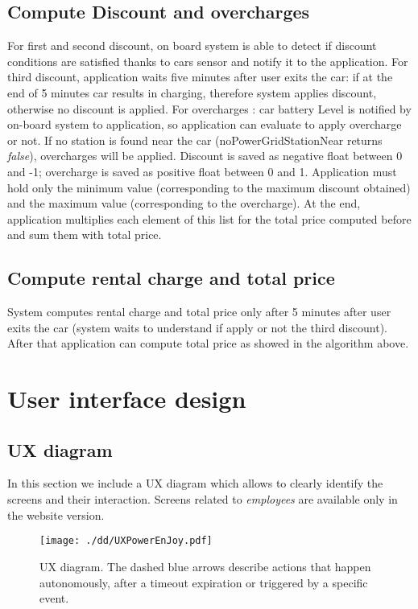 \documentclass{scrreprt}
\begin{document}
\section{Compute Discount and overcharges}
For first and second discount, on board system is able to detect if discount conditions are satisfied thanks to cars sensor and notify it to the application.
For third discount, application waits five minutes after user exits the car: if at the end of 5 minutes car results in charging, therefore system applies discount, otherwise no discount is applied.
For overcharges : car battery Level is notified by on-board system to application, so application can evaluate to apply overcharge or not. If no station is found near the car (noPowerGridStationNear returns \emph{false}), overcharges will be applied.
Discount is saved as negative float between 0 and -1; overcharge is saved as positive float between 0 and 1.
Application must hold only the minimum value (corresponding to the maximum discount obtained) and the maximum value (corresponding to the overcharge).
At the end, application multiplies each element of this list for the total price computed before and sum them with total price.

\section{Compute rental charge and total price}
System computes rental charge and total price only after 5 minutes after user exits the car (system waits to understand if apply or not the third discount).
After that application can compute total price as showed in the algorithm above.

\chapter{User interface design}

\section{UX diagram}
In this section we include a UX diagram which allows to clearly identify the screens and their interaction. Screens related to \emph{employees} are available only in the website version.
\begin{figure}[htb]
\centering
		\texttt{[image: ./dd/UXPowerEnJoy.pdf]}
		\caption{UX diagram. The dashed blue arrows describe actions that happen autonomously, after a timeout expiration or triggered by a specific event.}
		\label{UX}
\end{figure}
\end{document}
